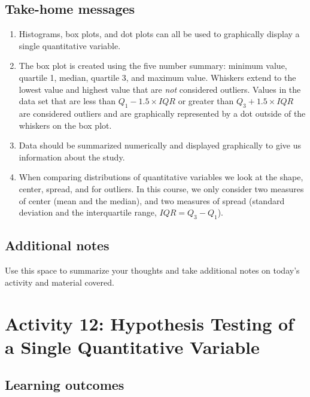 \documentclass[
]{report}
\begin{document}
\subsection{Take-home messages}\label{take-home-messages-10}

\begin{enumerate}
\def\labelenumi{\arabic{enumi}.}
\item
  Histograms, box plots, and dot plots can all be used to graphically display a single quantitative variable.
\item
  The box plot is created using the five number summary: minimum value, quartile 1, median, quartile 3, and maximum value. Whiskers extend to the lowest value and highest value that are \emph{not} considered outliers. Values in the data set that are less than \(Q_1 - 1.5\times IQR\) or greater than \(Q_3 + 1.5\times IQR\) are considered outliers and are graphically represented by a dot outside of the whiskers on the box plot.
\item
  Data should be summarized numerically and displayed graphically to give us information about the study.
\item
  When comparing distributions of quantitative variables we look at the shape, center, spread, and for outliers. In this course, we only consider two measures of center (mean and the median), and two measures of spread (standard deviation and the interquartile range, \(IQR = Q_3 - Q_1\)).
\end{enumerate}

\subsection{Additional notes}\label{additional-notes-10}

Use this space to summarize your thoughts and take additional notes on today's activity and material covered.

\newpage

\section{Activity 12: Hypothesis Testing of a Single Quantitative Variable}\label{activity-12-hypothesis-testing-of-a-single-quantitative-variable}


\subsection{Learning outcomes}\label{learning-outcomes-12}
\end{document}

